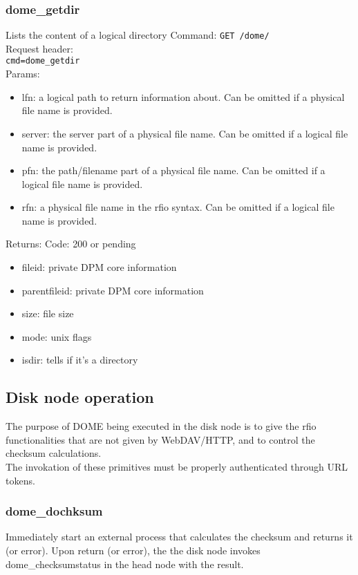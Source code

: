 \documentclass[a4paper,10pt]{scrreprt}
\begin{document}
\subsubsection{dome\_getdir}

Lists the content of a logical directory
Command:
\lstinline"GET /dome/"\\
Request header:\\
\lstinline"cmd=dome_getdir"\\
Params:
\begin{itemize}
 \item lfn: a logical path to return information about. Can be omitted if a physical file name is provided.
 \item server: the server part of a physical file name. Can be omitted if a logical file name is provided.
 \item pfn: the path/filename part of a physical file name. Can be omitted if a logical file name is provided.
 \item rfn: a physical file name in the rfio syntax. Can be omitted if a logical file name is provided.
\end{itemize}

Returns:
Code: 200 or pending
\begin{itemize}
 \item fileid: private DPM core information
 \item parentfileid: private DPM core information
 \item size: file size
 \item mode: unix flags
 \item isdir: tells if it's a directory
\end{itemize}



\subsection{Disk node operation}
The purpose of DOME being executed in the disk node is to give the rfio functionalities that are not
given by WebDAV/HTTP, and to control the checksum calculations.\\
The invokation of these primitives must be properly authenticated through URL tokens.\\

\subsubsection{dome\_dochksum}
 Immediately start an external process that calculates the checksum and returns it (or error).
 Upon return (or error), the the disk node invokes dome\_checksumstatus in the head node with the result.
 
\end{document}
